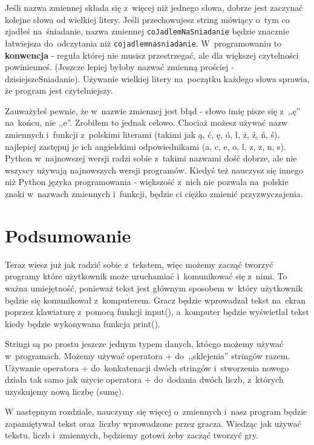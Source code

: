 \documentclass{book}
\begin{document}
Jeśli nazwa zmiennej składa się z~więcej niż jednego słowa, dobrze jest zaczynać kolejne słowa od wielkiej litery. Jeśli przechowujesz string mówiący o~tym co zjadłeś na~śniadanie, nazwa zmiennej \lstinline{coJadlemNaSniadanie} będzie znacznie łatwiejsza do~odczytania niż \lstinline{cojadlemnasniadanie}. W~programowaniu to {\bf konwencja} - reguła której nie musisz przestrzegać, ale dla większej czytelności powinienneś. (Jeszcze lepiej byłoby nazwać zmienną prościej - dzisiejszeSniadanie). Używanie wielkiej litery na~początku każdego słowa sprawia, że program jest czytelniejszy.

Zauważyłeś pewnie, że w~nazwie zmiennej jest błąd - słowo imię pisze się z~,,ę'' na~końcu, nie ,,e''. Zrobiłem to jednak celowo. Chociaż możesz używać nazw zmiennych i~funkcji z~polskimi literami (takimi jak ą, ć, ę, ó, ł, ż, ź, ń, ś), najlepiej zastępuj je ich angielskimi odpowiednikami (a, c, e, o, l, z, z, n, s). Python w~najnowszej wersji radzi sobie z~takimi nazwami dość dobrze, ale nie wszyscy używają najnowszych wersji programów. Kiedyś też nauczysz się innego niż Python języka programowania - większość z~nich nie pozwala na~polskie znaki w~nazwach zmiennych i~funkcji, będzie ci ciężko zmienić przyzwyczajenia.

\section{Podsumowanie}

Teraz wiesz już jak radzić sobie z~tekstem, więc możemy zacząć tworzyć programy które użytkownik może uruchamiać i~komunikować się z~nimi. To ważna umiejętność, ponieważ tekst jest głównym sposobem w~który użytkownik będzie się komunikował z~komputerem. Gracz będzie wprowadzał tekst na~ekran poprzez klawiaturę z~pomocą funkcji input(), a~komputer będzie wyświetlał tekst kiedy będzie wykonywana funkcja print().

Stringi są po prostu jeszcze jednym typem danych, któego możemy używać w~programach. Możemy używać operatora + do~,,sklejenia'' stringów razem. Używanie operatora + do~konkatenacji dwóch stringów i~stworzenia nowego działa tak samo jak użycie operatora + do~dodania dwóch liczb, z~których uzyskujemy nową liczbę (sumę).

W następnym rozdziale, nauczymy się więcej o~zmiennych i~nasz program będzie zapamiętywał tekst oraz~liczby wprowadzone przez gracza. Wiedząc jak używać tekstu, liczb i~zmiennych, będziemy gotowi żeby zacząć tworzyć gry.
\end{document}
